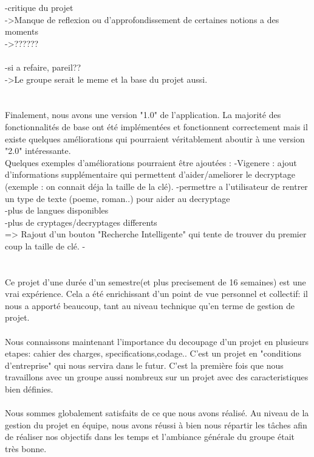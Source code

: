 \documentclass[a4]{article}
\begin{document}
	-critique du projet \\
	->Manque de reflexion ou d'approfondissement de certaines notions a des moments \\
	->?????? \\ \\
	
	
		
	-si a refaire, pareil?? \\
	->Le groupe serait le meme et la base du projet aussi. \\ \\ \\
	
	
	Finalement, nous avons une version "1.0" de l’application. La majorité des fonctionnalités
de base ont été implémentées et fonctionnent correctement mais il existe quelques
améliorations qui pourraient véritablement aboutir à une version "2.0" intéressante. \\
Quelques exemples d'améliorations pourraient être ajoutées :
-Vigenere : ajout d'informations supplémentaire qui permettent d'aider/ameliorer le decryptage 
(exemple : on connait déja la taille de la clé).
-permettre a l'utilisateur de rentrer un type de texte (poeme, roman..) pour aider au decryptage \\
-plus de langues disponibles \\
-plus de cryptages/decryptages differents \\
=> Rajout d'un bouton "Recherche Intelligente" qui tente de trouver du premier coup la taille de clé.
-\\ \\ \\

	
	
Ce projet d'une durée d'un semestre(et plus precisement de 16 semaines) est une vrai expérience.
Cela a été enrichissant d'un point de vue personnel et collectif:
il nous a apporté beaucoup, tant au
niveau technique qu’en terme de gestion de projet.  \\  \\
Nous connaissons maintenant l'importance du decoupage d'un projet en plusieurs etapes: cahier des charges, specifications,codage..
C'est un projet en "conditions d'entreprise" qui nous servira dans le futur.
C’est la première fois que nous travaillons avec un groupe aussi nombreux sur un projet avec des caracteristiques bien définies. \\ \\
Nous sommes globalement satisfaits de ce que nous avons réalisé.
 Au niveau de la gestion du projet en équipe, nous avons réussi à bien nous répartir les
tâches afin de réaliser nos objectifs dans les temps et l'ambiance générale du groupe était très
bonne. \\ \\ \\





	
	
	
\end{document}
